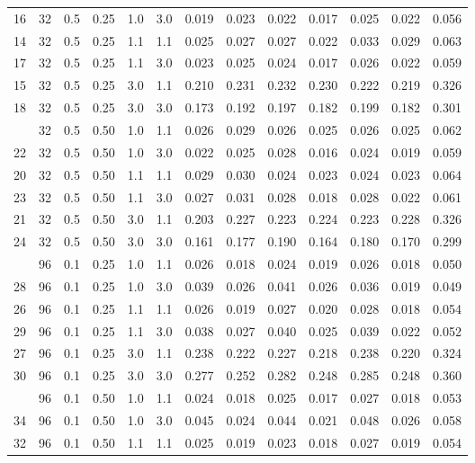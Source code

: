 \begin{longtable}[t]{ccccccrrrrrrc}
16 & 32 & 0.5 & 0.25 & 1.0 & 3.0 & 0.019 & 0.023 & 0.022 & 0.017 & 0.025 & 0.022 & 0.056\\
14 & 32 & 0.5 & 0.25 & 1.1 & 1.1 & 0.025 & 0.027 & 0.027 & 0.022 & 0.033 & 0.029 & 0.063\\
17 & 32 & 0.5 & 0.25 & 1.1 & 3.0 & 0.023 & 0.025 & 0.024 & 0.017 & 0.026 & 0.022 & 0.059\\
15 & 32 & 0.5 & 0.25 & 3.0 & 1.1 & 0.210 & 0.231 & 0.232 & 0.230 & 0.222 & 0.219 & 0.326\\
18 & 32 & 0.5 & 0.25 & 3.0 & 3.0 & 0.173 & 0.192 & 0.197 & 0.182 & 0.199 & 0.182 & 0.301\\
\addlinespace
19 & 32 & 0.5 & 0.50 & 1.0 & 1.1 & 0.026 & 0.029 & 0.026 & 0.025 & 0.026 & 0.025 & 0.062\\
22 & 32 & 0.5 & 0.50 & 1.0 & 3.0 & 0.022 & 0.025 & 0.028 & 0.016 & 0.024 & 0.019 & 0.059\\
20 & 32 & 0.5 & 0.50 & 1.1 & 1.1 & 0.029 & 0.030 & 0.024 & 0.023 & 0.024 & 0.023 & 0.064\\
23 & 32 & 0.5 & 0.50 & 1.1 & 3.0 & 0.027 & 0.031 & 0.028 & 0.018 & 0.028 & 0.022 & 0.061\\
21 & 32 & 0.5 & 0.50 & 3.0 & 1.1 & 0.203 & 0.227 & 0.223 & 0.224 & 0.223 & 0.228 & 0.326\\
24 & 32 & 0.5 & 0.50 & 3.0 & 3.0 & 0.161 & 0.177 & 0.190 & 0.164 & 0.180 & 0.170 & 0.299\\
\addlinespace
25 & 96 & 0.1 & 0.25 & 1.0 & 1.1 & 0.026 & 0.018 & 0.024 & 0.019 & 0.026 & 0.018 & 0.050\\
28 & 96 & 0.1 & 0.25 & 1.0 & 3.0 & 0.039 & 0.026 & 0.041 & 0.026 & 0.036 & 0.019 & 0.049\\
26 & 96 & 0.1 & 0.25 & 1.1 & 1.1 & 0.026 & 0.019 & 0.027 & 0.020 & 0.028 & 0.018 & 0.054\\
29 & 96 & 0.1 & 0.25 & 1.1 & 3.0 & 0.038 & 0.027 & 0.040 & 0.025 & 0.039 & 0.022 & 0.052\\
27 & 96 & 0.1 & 0.25 & 3.0 & 1.1 & 0.238 & 0.222 & 0.227 & 0.218 & 0.238 & 0.220 & 0.324\\
30 & 96 & 0.1 & 0.25 & 3.0 & 3.0 & 0.277 & 0.252 & 0.282 & 0.248 & 0.285 & 0.248 & 0.360\\
\addlinespace
31 & 96 & 0.1 & 0.50 & 1.0 & 1.1 & 0.024 & 0.018 & 0.025 & 0.017 & 0.027 & 0.018 & 0.053\\
34 & 96 & 0.1 & 0.50 & 1.0 & 3.0 & 0.045 & 0.024 & 0.044 & 0.021 & 0.048 & 0.026 & 0.058\\
32 & 96 & 0.1 & 0.50 & 1.1 & 1.1 & 0.025 & 0.019 & 0.023 & 0.018 & 0.027 & 0.019 & 0.054\\

\end{longtable}
